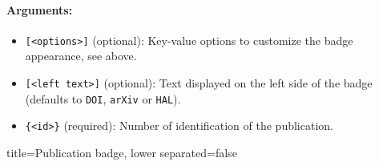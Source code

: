 \paragraph{Arguments:}
\begin{itemize}
    \item \texttt{[<options>]} (optional): Key-value options to customize the badge appearance, see above.
    \item \texttt{[<left text>]} (optional): Text displayed on the left side of the badge (defaults to \texttt{DOI}, \texttt{arXiv} or \texttt{HAL}).
    \item \texttt{\{<id>\}} (required): Number of identification of the publication.
\end{itemize}


\begin{tcblisting}{title={Publication badge}, lower separated=false}
\end{tcblisting}